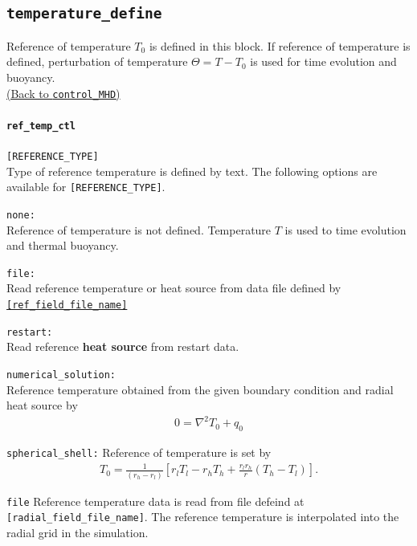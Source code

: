 \subsection{\tt temperature\_define}
\label{href_t:temperature_define}
Reference of temperature $T_{0}$ is defined in this block. If reference of temperature is defined, perturbation of temperature $\Theta = T - T_{0}$ is used for time evolution and buoyancy. \\
\hyperref[href_i:temperature_define]{(Back to {\tt control\_MHD})}

\paragraph{\tt ref\_temp\_ctl}
\label{href_t:ref_temp_ctl}
\verb|[REFERENCE_TYPE]| \\
Type of reference temperature is defined by text. The following options are available for \verb|[REFERENCE_TYPE]|.
%
\begin{description}
\item{\tt none: }   \\
Reference of temperature is not defined. Temperature $T$ is used to time evolution and thermal buoyancy.
\item{\tt file: }      \\
Read reference temperature or heat source from data file defined by \hyperref[href_t:ref_field_file_name]{\tt [ref\_field\_file\_name]}
\item{\tt restart: }      \\
Read reference {\bf heat source} from restart data.
\item{\tt numerical\_solution: } \\
Reference temperature obtained from the given boundary condition and radial heat source by
\begin{eqnarray}
 0 = \nabla^{2} T_{0} + q_{0}
 \nonumber
\end{eqnarray}
%

\item{\tt spherical\_shell:} Reference of temperature is set by
\begin{eqnarray}
 T_{0} = \frac{1}{\left(r_{h}-r_{l} \right)} \left[
          r_{l}T_{l} - r_{h}T_{h} + \frac{r_{l} r_{h}}{r} \left(T_{h}-T_{l}\right) \right].
\nonumber
\end{eqnarray}
\item{\tt file} Reference temperature data is read from file defeind at {\tt [radial\_field\_file\_name]}. The reference temperature is interpolated into the radial grid in the simulation.
\end{description}
%

